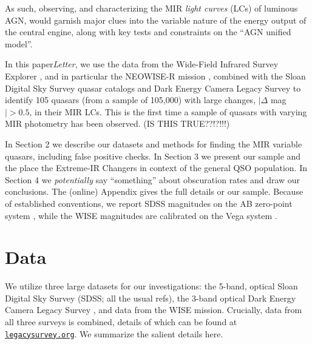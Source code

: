 \documentclass{emulateapj}
\begin{document}
As such, observing, and characterizing the MIR {\it light curves} (LCs) of
luminous AGN, would garnish major clues into the variable nature of
the energy output of the central engine, along with key tests and
constraints on the ``AGN unified model''.

In this paper{\it Letter}, we use the data from the Wide-Field
Infrared Survey Explorer \citep[WISE; ][]{Wright10}, and in particular
the NEOWISE-R mission \citep{Mainzer14, Meisner16}, combined with the
Sloan Digital Sky Survey quasar catalogs \citep[DR7Q][]{Schneider10}
and Dark Energy Camera Legacy Survey \citep[DECaLS][]{Lang16} to
identify 105 quasars (from a sample of 105,000) with large changes,
$|\Delta$ mag$|>0.5$, in their MIR LCs. This is the first time a
sample of quasars with varying MIR photometry has been observed. (IS
THIS TRUE??!?!!!)

In Section 2 we describe our datasets and methods for finding the MIR
variable quasars, including false positive checks. In Section 3 we
present our sample and the place the Extreme-IR Changers in context of
the general QSO population. In Section 4 we {\it potentially} say
``something'' about obscuration rates and draw our conclusions. 
The (online) Appendix gives the full details or our sample. 
Because of established conventions, we report SDSS magnitudes on the
AB zero-point system \citep{Oke83, Fukugita96}, while the WISE
magnitudes are calibrated on the Vega system \citep{Wright10}.

\section{Data}
We utilize three large datasets for our investigations: the 5-band,
optical Sloan Digital Sky Survey (SDSS; all the usual refs), the
3-band optical Dark Energy Camera Legacy Survey
\citep[DECaLS]{Lang16}, and data from the WISE mission. Crucially,
data from all three surveys is combined, details of which can be found
at \href{legacysurvey.org}{\tt legacysurvey.org}. We summarize the
salient details here.
\end{document}
